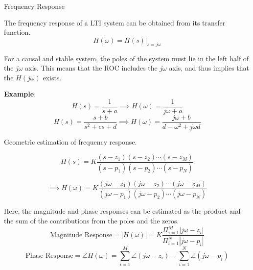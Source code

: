 \documentclass{beamer}
\begin{document}
\begin{frame}{Frequency Response}

The frequency response of a LTI system can be obtained from its transfer function.
\[ H(\omega) = H(s)\Big|_{s=j\omega} \]

For a causal and stable system, the poles of the system must lie in the left half of the $j\omega$ axis. This means that the ROC includes the $j\omega$ axis, and thus implies that the $H(j\omega)$ exists.

\textbf{Example}:
\[ H(s) = \frac{1}{s+a} \implies H(\omega) = \frac{1}{j\omega + a} \]
\[ H(s) = \frac{s+b}{s^2+cs+d} \implies H(\omega) = \frac{j\omega+b}{d - \omega^2 + j\omega d} \]

\end{frame}

\begin{frame}{Geometric estimation of frequency response.}

\[ H(s) = K\frac{\left(s - z_1\right)\left(s - z_2\right)\cdots\left(s - z_M\right)}{\left(s - p_1\right)\left(s - p_2\right)\cdots\left(s - p_N\right)}\]

\[\implies H(\omega) = K\frac{\left(j\omega - z_1\right)\left(j\omega - z_2\right)\cdots\left(j\omega - z_M\right)}{\left(j\omega - p_1\right)\left(j\omega - p_2\right)\cdots\left(j\omega - p_N\right)} \]

Here, the magnitude and phase responses can be estimated as the product and the sum of the contributions from the poles and the zeros.
\[ \text{Magnitude Response} =\left|H(\omega)\right| = K \frac{\Pi_{i=1}^{M}\left|j\omega - z_i\right|}{\Pi_{i=1}^{N}\left|j\omega - p_i\right|} \]
\[ \text{Phase Response} = \angle H(\omega) =  \sum_{i=1}^{M}\angle \left(j\omega - z_i\right) - \sum_{i=1}^{N}\angle \left(j\omega - p_i\right) \]

\end{frame}
\end{document}
